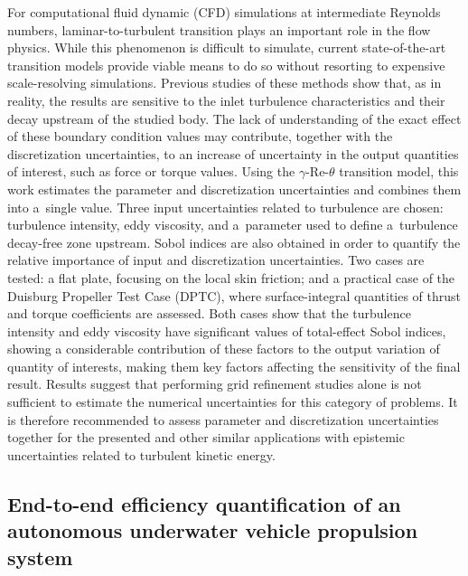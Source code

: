 \documentclass[a4paper,10pt]{article}
\begin{document}
For computational fluid dynamic (CFD) simulations at intermediate Reynolds numbers, laminar-to-turbulent transition plays an important role in the flow physics. While this phenomenon is difficult to simulate, current state-of-the-art transition models provide viable means to do so without resorting to expensive scale-resolving simulations. Previous studies of these methods show that, as in reality, the results are sensitive to the inlet turbulence characteristics and their decay upstream of the studied body. The lack of understanding of the exact effect of these boundary condition values may contribute, together with the discretization uncertainties, to an increase of uncertainty in the output quantities of interest, such as force or torque values. Using the $\gamma$-Re-$\theta$ transition model, this work estimates the parameter and discretization uncertainties and combines them into a single value. Three input uncertainties related to turbulence are chosen: turbulence intensity, eddy viscosity, and a parameter used to define a turbulence decay-free zone upstream. Sobol indices are also obtained in order to quantify the relative importance of input and discretization uncertainties. Two cases are tested: a flat plate, focusing on the local skin friction; and a practical case of the Duisburg Propeller Test Case (DPTC), where surface-integral quantities of thrust and torque coefficients are assessed. Both cases show that the turbulence intensity and eddy viscosity have significant values of total-effect Sobol indices, showing a considerable contribution of these factors to the output variation of quantity of interests, making them key factors affecting the sensitivity of the final result. Results suggest that performing grid refinement studies alone is not sufficient to estimate the numerical uncertainties for this category of problems. It is therefore recommended to assess parameter and discretization uncertainties together for the presented and other similar applications with epistemic uncertainties related to turbulent kinetic energy.

\subsection{End-to-end efficiency quantification of an autonomous underwater vehicle propulsion system \cite{Lidtke2021a}}
\end{document}
